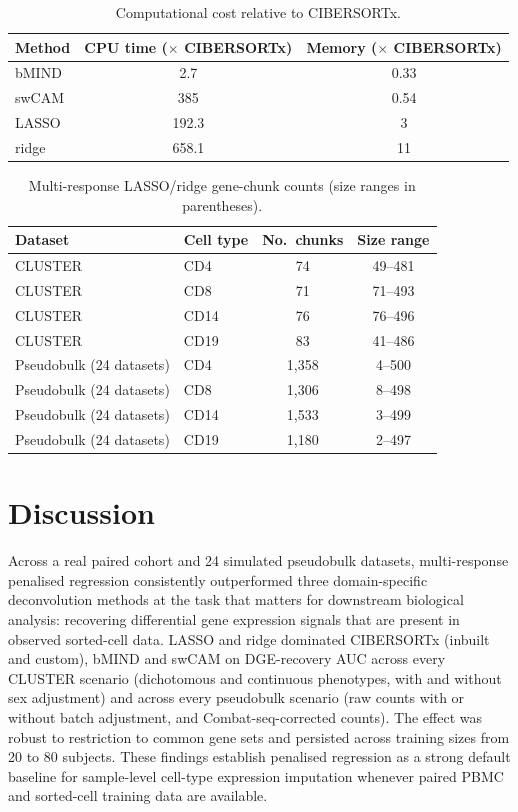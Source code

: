 \documentclass[11pt]{article}
\begin{document}
\begin{table}[H]
\centering
\caption{Computational cost relative to CIBERSORTx.}
\label{tab:compute}
\begin{tabular}{lcc}
\toprule
Method & CPU time ($\times$ CIBERSORTx) & Memory ($\times$ CIBERSORTx) \\
\midrule
bMIND & 2.7 & 0.33 \\
swCAM & 385 & 0.54 \\
LASSO & 192.3 & 3 \\
ridge & 658.1 & 11 \\
\bottomrule
\end{tabular}
\end{table}

\begin{table}[H]
\centering
\caption{Multi-response LASSO/ridge gene-chunk counts (size ranges in parentheses).}
\label{tab:chunks}
\begin{tabular}{llcc}
\toprule
Dataset & Cell type & No.\ chunks & Size range \\
\midrule
CLUSTER & CD4 & 74 & 49--481 \\
CLUSTER & CD8 & 71 & 71--493 \\
CLUSTER & CD14 & 76 & 76--496 \\
CLUSTER & CD19 & 83 & 41--486 \\
Pseudobulk (24 datasets) & CD4 & 1{,}358 & 4--500 \\
Pseudobulk (24 datasets) & CD8 & 1{,}306 & 8--498 \\
Pseudobulk (24 datasets) & CD14 & 1{,}533 & 3--499 \\
Pseudobulk (24 datasets) & CD19 & 1{,}180 & 2--497 \\
\bottomrule
\end{tabular}
\end{table}

\section{Discussion}

Across a real paired cohort and 24 simulated pseudobulk datasets,
multi-response penalised regression consistently outperformed three
domain-specific deconvolution methods at the task that matters for
downstream biological analysis: recovering differential gene
expression signals that are present in observed sorted-cell data.
LASSO and ridge dominated CIBERSORTx (inbuilt and custom), bMIND and
swCAM on DGE-recovery AUC across every CLUSTER scenario (dichotomous
and continuous phenotypes, with and without sex adjustment) and across
every pseudobulk scenario (raw counts with or without batch
adjustment, and Combat-seq-corrected counts). The effect was robust to
restriction to common gene sets and persisted across training sizes
from 20 to 80 subjects. These findings establish penalised regression
as a strong default baseline for sample-level cell-type expression
imputation whenever paired PBMC and sorted-cell training data are
available.
\end{document}
